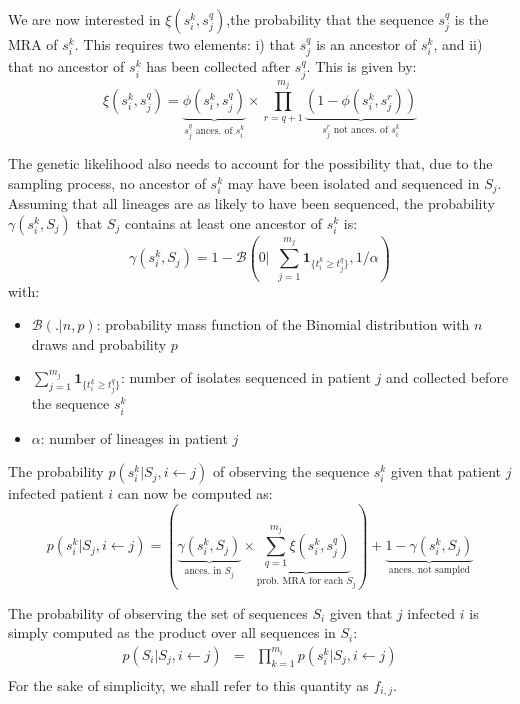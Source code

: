 \documentclass[10pt]{article}
\begin{document}
We are now interested in $\xi(s_i^k, s_j^q)$,the probability that the sequence $s_j^q$ is the MRA of $s_i^k$.
This requires two elements: i) that $s_j^q$ is an ancestor of $s_i^k$, and ii) that no ancestor of $s_i^k$ has been collected after $s_j^q$.
This is given by:
$$
\xi(s_i^k, s_j^q) = \underbrace{\phi(s_i^k, s_j^q)}_{s_j^q \mbox{ ances. of } s_i^k} \times 
\prod_{r=q+1}^{m_j} \underbrace{(1 - \phi(s_i^k, s_j^r))}_{s_j^r \mbox{ not ances. of } s_i^k}
$$


The genetic likelihood also needs to account for the possibility that, due to the sampling process, no ancestor of $s_i^k$ may have been isolated and sequenced in $S_j$.
Assuming that all lineages are as likely to have been sequenced, the probability $\gamma(s_i^k, S_j)$ that $S_j$ contains at least one ancestor of $s_i^k$ is:
$$
\gamma(s_i^k, S_j) = 1 - \mathcal{B}\left(0 \lvert \:\: \sum_{j=1}^{m_j}\mathbf{1}_{\{t_i^k \geq t_j^q\}}, 1/\alpha \right)
$$
with:
\begin{itemize}
\item $\mathcal{B}(.\lvert n,p)$: probability mass function of the Binomial distribution with $n$ draws and probability $p$
\item $\sum_{j=1}^{m_j}\mathbf{1}_{\{t_i^k \geq t_j^q\}}$: number of isolates sequenced in patient $j$ and collected before the sequence $s_i^k$
\item $\alpha$: number of lineages in patient $j$
\end{itemize}


The probability $p(s_i^k | S_j, i \leftarrow j)$ of observing the sequence $s_i^k$ given that patient $j$ infected patient $i$ can now be computed as:
$$
p(s_i^k | S_j, i \leftarrow j) = 
(\underbrace{\gamma(s_i^k, S_j)}_{\mbox{ances. in }S_j} \times 
\underbrace{\sum_{q=1}^{m_j}\xi(s_i^k, s_j^q)}_{\mbox{prob. MRA for each }S_j} ) + 
\underbrace{1 - \gamma(s_i^k, S_j)}_{\mbox{ances. not sampled}}
$$


The probability of observing the set of sequences $S_i$ given that $j$ infected $i$ is simply computed as the product over all sequences in $S_i$:
\begin{eqnarray*}
p(S_i | S_j, i \leftarrow j) & = & \prod_{k=1}^{m_i} p(s_i^k | S_j, i \leftarrow j) \\
\end{eqnarray*}
For the sake of simplicity, we shall refer to this quantity as $f_{i,j}$.
\\
\end{document}
